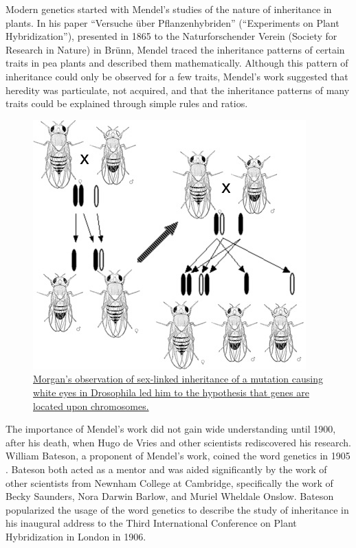 Modern genetics started with Mendel's studies of the nature of inheritance in plants. In his paper ``Versuche über Pflanzenhybriden'' (``Experiments on Plant Hybridization''), presented in 1865 to the Naturforschender Verein (Society for Research in Nature) in Brünn, Mendel traced the inheritance patterns of certain traits in pea plants and described them mathematically. Although this pattern of inheritance could only be observed for a few traits, Mendel's work suggested that heredity was particulate, not acquired, and that the inheritance patterns of many traits could be explained through simple rules and ratios.



\begin{figure}

{\centering \includegraphics[width=0.7\linewidth]{./figures/genetics/Sexlinked_inheritance_white} 

}

\caption{\href{https://commons.wikimedia.org/wiki/File:Sexlinked_inheritance_white.jpg}{Morgan's observation of sex-linked inheritance of a mutation causing white eyes in Drosophila led him to the hypothesis that genes are located upon chromosomes.}}\label{fig:sexlinked}
\end{figure}

The importance of Mendel's work did not gain wide understanding until 1900, after his death, when Hugo de Vries and other scientists rediscovered his research. William Bateson, a proponent of Mendel's work, coined the word genetics in 1905 . Bateson both acted as a mentor and was aided significantly by the work of other scientists from Newnham College at Cambridge, specifically the work of Becky Saunders, Nora Darwin Barlow, and Muriel Wheldale Onslow. Bateson popularized the usage of the word genetics to describe the study of inheritance in his inaugural address to the Third International Conference on Plant Hybridization in London in 1906.

